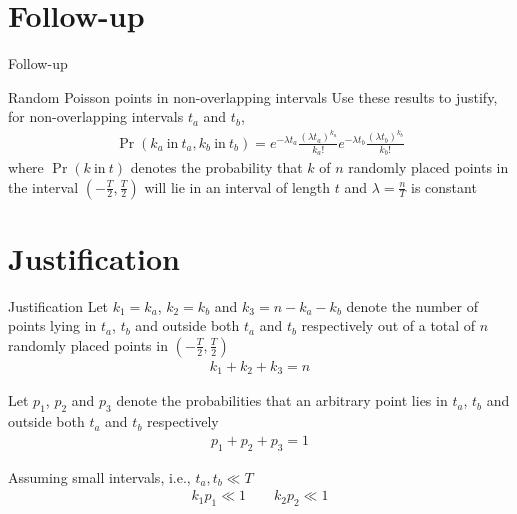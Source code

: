 \documentclass{beamer}
\providecommand{\pr}[1]{\ensuremath{\Pr\left(#1\right)}}
\providecommand{\brak}[1]{\ensuremath{\left(#1\right)}}
\begin{document}
	\section{Follow-up}
	\begin{frame}{Follow-up}
	\begin{block}{Random Poisson points in non-overlapping intervals}
	Use these results to justify, for non-overlapping intervals $t_a$ and $t_b$,
		\begin{align}
			\pr{k_a~\mathrm{in}~t_a, k_b~\mathrm{in}~t_b} = e^{-\lambda t_a} \frac{(\lambda t_a)^{k_a}}{k_a!} e^{-\lambda t_b} \frac{(\lambda t_b)^{k_b}}{k_b!}
		\end{align}
		where $\pr{k~\mathrm{in}~t}$ denotes the probability that $k$ of $n$ randomly placed points in the interval $\brak{-\frac{T}{2}, \frac{T}{2}}$ will lie in an interval of length $t$ and $\lambda = \frac{n}{T}$ is constant
	\end{block}
	\end{frame}
	
	\section{Justification}
	\begin{frame}{Justification}
	Let $k_1 = k_a$, $k_2 = k_b$ and $k_3 = n - k_a - k_b$ denote the number of points lying in $t_a$, $t_b$ and outside both $t_a$ and $t_b$ respectively out of a total of $n$ randomly placed points in $\brak{-\frac{T}{2}, \frac{T}{2}}$
	\begin{align}
		k_1 + k_2 + k_3 = n
	\end{align}
	
	Let $p_1$, $p_2$ and $p_3$ denote the probabilities that an arbitrary point lies in $t_a$, $t_b$ and outside both $t_a$ and $t_b$ respectively
	\begin{align}
		p_1 + p_2 + p_3 = 1
	\end{align}
	
	Assuming small intervals, i.e., $t_a, t_b \ll T$
	\begin{align}
		k_1 p_1 \ll 1 \qquad k_2 p_2 \ll 1
	\end{align}
	\end{frame}		
	
\end{document}
